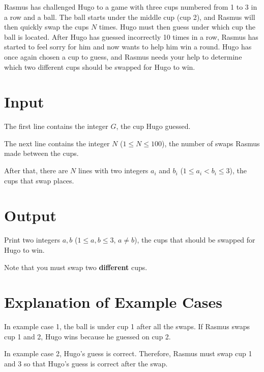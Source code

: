 
Rasmus has challenged Hugo to a game with three cups numbered from 1 to 3 in a row and a ball. The ball starts under the middle cup (cup 2), and Rasmus will then quickly swap the cups $N$ times. Hugo must then guess under which cup the ball is located. After Hugo has guessed incorrectly 10 times in a row, Rasmus has started to feel sorry for him and now wants to help him win a round. Hugo has once again chosen a cup to guess, and Rasmus needs your help to determine which two different cups should be swapped for Hugo to win.

\section*{Input}
The first line contains the integer $G$, the cup Hugo guessed.

The next line contains the integer $N$ ($1 \le N \le 100$), the number of swaps Rasmus made between the cups.

After that, there are $N$ lines with two integers $a_i$ and $b_i$ ($1 \le a_i < b_i \le 3$), the cups that swap places.

\section*{Output}
Print two integers $a,b$ ($1 \leq a,b \leq 3$, $a \neq b$), the cups that should be swapped for Hugo to win.

Note that you must swap two \textbf{different} cups.

\section*{Explanation of Example Cases}
In example case 1, the ball is under cup 1 after all the swaps. If Rasmus swaps cup 1 and 2, Hugo wins because he guessed on cup 2.

In example case 2, Hugo’s guess is correct. Therefore, Rasmus must swap cup 1 and 3 so that Hugo's guess is correct after the swap.
